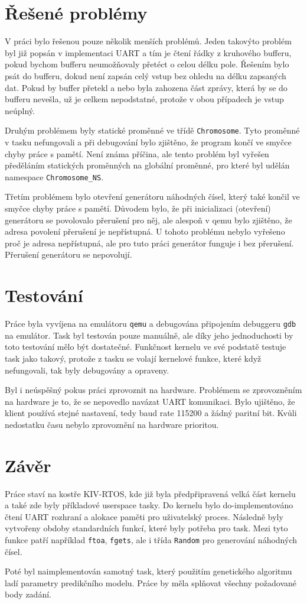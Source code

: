 \documentclass[12pt, letterpaper]{article}
\begin{document}
\section{Řešené problémy}
V práci bylo řešenou pouze několik menších problémů. Jeden takovýto problém byl již popsán v implementaci UART a tím
je čtení řádky z kruhového bufferu, pokud bychom bufferu neumožňovaly přetéct o celou délku pole. Řešením bylo
psát do bufferu, dokud není zapsán celý vstup bez ohledu na délku zapsaných dat. Pokud by buffer přetekl a nebo byla
zahozena část zprávy, která by se do bufferu nevešla, už je celkem nepodstatné, protože v obou případech je vstup
neúplný.

Druhým problémem byly statické proměnné ve třídě \texttt{Chromosome}. Tyto proměnné v tasku nefungovali a při debugování
bylo zjištěno, že program končí ve smyčce chyby práce s pamětí. Není známa příčina, ale tento problém byl vyřešen
předěláním statických proměnných na globální proměnné, pro které byl udělán namespace \texttt{Chromosome\_NS}.

Třetím problémem bylo otevření generátoru náhodných čísel, který také končil ve smyčce chyby práce s pamětí. Důvodem
bylo, že při inicializaci (otevření) generátoru se povolovalo přerušení pro něj, ale alespoň v qemu bylo zjištěno, že
adresa povolení přerušení je nepřístupná. U tohoto problému nebylo vyřešeno proč je adresa nepřístupná, ale pro tuto
práci generátor funguje i bez přerušení. Přerušení generátoru se nepovolují.
%
\section{Testování}
Práce byla vyvíjena na emulátoru \texttt{qemu} a debugována připojením debuggeru \texttt{gdb} na emulátor. 
Task byl testován pouze manuálně, ale díky jeho jednoduchosti by toto testování mělo být dostatečné. Funkčnost
kernelu ve své podstatě testuje task jako takový, protože z tasku se volají kernelové funkce, které když nefungovali,
tak byly debugovány a opraveny.

Byl i neúspěšný pokus práci zprovoznit na hardware. Problémem se zprovo\-zněním na hardware je to, že se nepovedlo
navázat UART komunikaci. Bylo ujištěno, že klient používá stejné nastavení, tedy baud rate 115200 a žádný paritní bit.
Kvůli nedostatku času nebylo zprovoznění na hardware prioritou.
%
\section{Závěr}
Práce staví na kostře KIV-RTOS, kde již byla předpřipravená velká část kernelu a také zde byly příkladové userspace 
tasky. Do kernelu bylo do-implementováno čtení UART rozhraní a alokace paměti pro uživatelský proces. Následně byly 
vytvořeny obdoby standardních funkcí, které byly potřeba pro task. Mezi tyto funkce patří například \texttt{ftoa},
\texttt{fgets}, ale i třída \texttt{Random} pro generování náhodných čísel.

Poté byl naimplementován samotný task, který použitím genetického algoritmu ladí parametry predikčního modelu.
Práce by měla splňovat všechny požadované body zadání.
\end{document}
